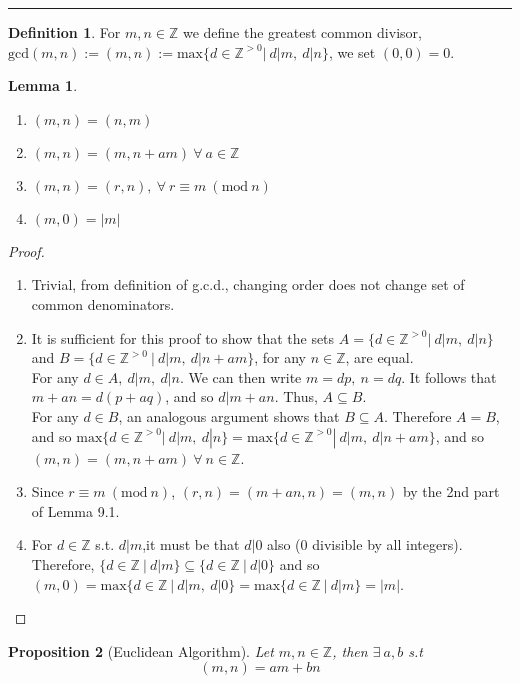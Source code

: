 \documentclass{article}
\newtheorem{theorem}{Proposition}[section]
\newtheorem{lemma}[theorem]{Lemma}
\theoremstyle{definition}
\newtheorem{definition}{Definition}[section]
\theoremstyle{remark}
\begin{document}
\hrule
\vspace{2mm}
\begin{definition}
For $m,n\in\mathbb{Z}$ we define the greatest common divisor, $\mathrm{gcd}(m,n):=(m,n):=\mathrm{max}\lbrace d\in\mathbb{Z}^{>0}|~d|m,~d|n\rbrace$, we set $(0,0)=0$.
\end{definition}
\begin{lemma}~
\begin{enumerate}
\item $(m,n)=(n,m)$
\item $(m,n)=(m,n+am)~\forall ~a\in \mathbb{Z}$
\item $(m,n)=(r,n),~\forall ~r\equiv m ~(\mathrm{mod}~n)$
\item $(m,0)=|m|$
\end{enumerate}
\end{lemma}
\begin{proof}
\begin{enumerate}
\item Trivial, from definition of g.c.d., changing order does not change set of common denominators.
\item It is sufficient for this proof to show that the sets $A=\lbrace d\in\mathbb{Z}^{>0}|~d|m,~d|n\rbrace$ and $B=\lbrace d\in\mathbb{Z}^{>0}~|~d|m,~d|n+am\rbrace$, for any $n\in\mathbb{Z}$, are equal.\\

For any $d\in A,~d|m,~d|n$. We can then write $m=dp,~n=dq$. It follows that $m+an=d(p+aq)$, and so $d|m+an$. Thus, $A\subseteq B$.\\
For any $d\in B$, an analogous argument shows that $B\subseteq A$. Therefore $A=B$, and so $\mathrm{max}\lbrace d\in\mathbb{Z}^{>0}|~d|m,~d|n\rbrace=\mathrm{max}\lbrace d\in\mathbb{Z}^{>0}|~d|m,~d|n+am\rbrace$, and so $(m,n)=(m,n+am)~\forall~n\in\mathbb{Z}$.
\item Since $r\equiv m~(\mathrm{mod}~n)$, $(r,n)=(m+an,n)=(m,n)$ by the 2nd part of Lemma 9.1.
\item For $d\in\mathbb{Z}$ s.t. $d|m$,it must be that $d|0$ also (0 divisible by all integers). Therefore, $\lbrace d\in\mathbb{Z}~|~d|m\rbrace \subseteq \lbrace d\in\mathbb{Z}~|~d|0\rbrace$ and so $(m,0)=\mathrm{max}\lbrace d\in\mathbb{Z}~|~d|m,~d|0\rbrace=\mathrm{max}\lbrace d\in\mathbb{Z}~|~d|m\rbrace=|m|$.
\end{enumerate}
\end{proof}
\begin{theorem}[Euclidean Algorithm]
\label{EuclidAlg}
Let $m,n\in\mathbb{Z}$, then $\exists~a,b$ s.t
\begin{equation}
(m,n)=am+bn
\end{equation}
\end{theorem}
\end{document}
